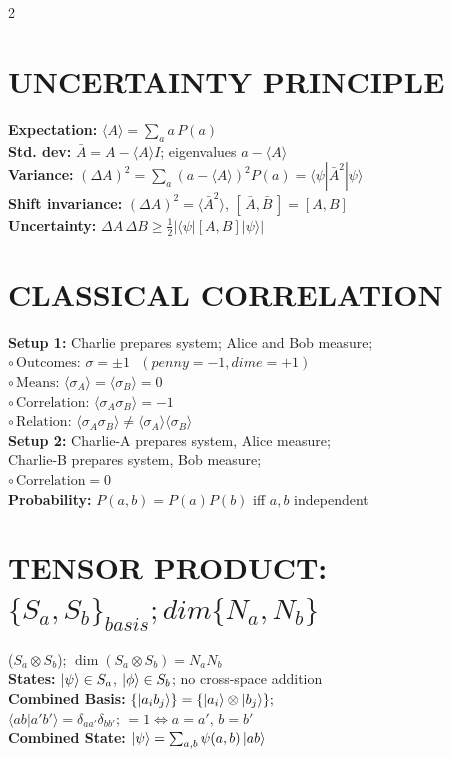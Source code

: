 \documentclass[10pt,a4paper]{article}
\begin{document}
\begin{multicols}{2}
\section{UNCERTAINTY PRINCIPLE}
\textbf{Expectation:} $\langle A \rangle = \sum_a a\,P(a)$ \\
\textbf{Std. dev:} $\bar{A}=A-\langle A\rangle I$; eigenvalues $a-\langle A\rangle$ \\
\textbf{Variance:} 
$(\Delta A)^2 = \sum_a (a-\langle A\rangle)^2 P(a) 
= \langle \psi | \bar{A}^2 | \psi \rangle$ \\
\textbf{Shift invariance:} $(\Delta A)^2=\langle \bar{A}^2\rangle$, 
$[\,\bar{A},\bar{B}\,]=[A,B]$ \\
\textbf{Uncertainty:} 
$\Delta A\,\Delta B \ge \tfrac{1}{2}\left| \langle \psi | [A,B] | \psi \rangle \right|$\\

\section{CLASSICAL CORRELATION}

\textbf{Setup 1:} Charlie prepares system; Alice and Bob measure; \\
$\circ\,\text{Outcomes: } \sigma=\pm1 \text{ }(penny =-1, dime =+1)$ \\
$\circ\,\text{Means: } \langle \sigma_A \rangle = \langle \sigma_B \rangle = 0$\\
$\circ\,\text{Correlation: } \langle \sigma_A \sigma_B \rangle = -1$\\
$\circ\,\text{Relation: } \langle \sigma_A \sigma_B \rangle \neq \langle \sigma_A \rangle \langle \sigma_B \rangle $\\
\textbf{Setup 2:} Charlie-A prepares system, Alice measure; \\ Charlie-B prepares system, Bob measure;\\
$\circ\,\text{Correlation} = 0$ \\
\textbf{Probability:}  $P(a,b)=P(a)P(b)$ iff $a,b$ independent\\

\section{TENSOR PRODUCT: $\{S_{a}, S_{b}\}_{basis}; dim\{N_a, N_b\} $}
($S_a \otimes S_b$); $\dim(S_a\otimes S_b)=N_aN_b$ \\
\textbf{States:} $\ket{\psi}\in S_a$, $\ket{\phi}\in S_b$; no cross-space addition \\
\textbf{Combined Basis:} $\{\ket{a_i b_j}\}=\{\ket{a_i}\otimes\ket{b_j}\}; $\\
$\langle ab|a'b'\rangle=\delta_{aa'}\delta_{bb'}$; $=1 \iff a=a',\, b=b'$\\
\textbf{Combined State:} $\ket{\psi} = \sum_{a,b} \psi(a,b)\ket{ab}$\\


\end{multicols}
\end{document}

